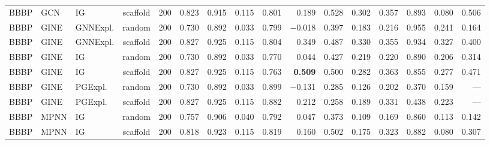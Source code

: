 \begin{table}
{\begin{tabular}{lllcrrrrrrrrrrrr}
BBBP & GCN & IG & scaffold & 200 & 0.823 & 0.915 & 0.115 & 0.801 & 0.189 & 0.528 & 0.302 & 0.357 & 0.893 & 0.080 & 0.506 \\
BBBP & GINE & GNNExpl. & random & 200 & 0.730 & 0.892 & 0.033 & 0.799 & $-$0.018 & 0.397 & 0.183 & 0.216 & 0.955 & 0.241 & 0.164 \\
BBBP & GINE & GNNExpl. & scaffold & 200 & 0.827 & 0.925 & 0.115 & 0.804 & 0.349 & 0.487 & 0.330 & 0.355 & 0.934 & 0.327 & 0.400 \\
BBBP & GINE & IG & random & 200 & 0.730 & 0.892 & 0.033 & 0.770 & 0.044 & 0.427 & 0.219 & 0.220 & 0.890 & 0.206 & 0.314 \\
BBBP & GINE & IG & scaffold & 200 & 0.827 & 0.925 & 0.115 & 0.763 & \textbf{0.509} & 0.500 & 0.282 & 0.363 & 0.855 & 0.277 & 0.471 \\
BBBP & GINE & PGExpl. & random & 200 & 0.730 & 0.892 & 0.033 & 0.899 & $-$0.131 & 0.285 & 0.126 & 0.202 & 0.370 & 0.159 & --- \\
BBBP & GINE & PGExpl. & scaffold & 200 & 0.827 & 0.925 & 0.115 & 0.882 & 0.212 & 0.258 & 0.189 & 0.331 & 0.438 & 0.223 & --- \\
BBBP & MPNN & IG & random & 200 & 0.757 & 0.906 & 0.040 & 0.792 & 0.047 & 0.373 & 0.109 & 0.169 & 0.860 & 0.113 & 0.142 \\
BBBP & MPNN & IG & scaffold & 200 & 0.818 & 0.923 & 0.115 & 0.819 & 0.160 & 0.502 & 0.175 & 0.323 & 0.882 & 0.080 & 0.307 \\
\bottomrule
\end{tabular}}
\end{table}
